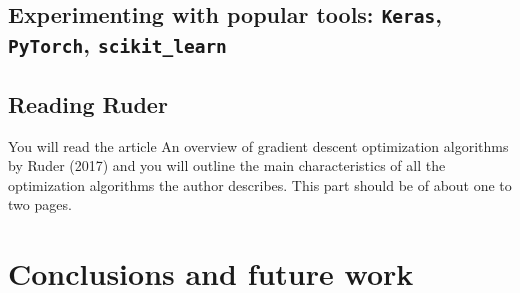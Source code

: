 \documentclass[a4paper]{article}
\begin{document}
\subsection{Experimenting with popular tools: \texttt{Keras}, \texttt{PyTorch}, \texttt{scikit\_learn}}

\subsection{Reading Ruder}
You will read the article An overview of gradient descent optimization algorithms by Ruder (2017) and you will outline the main characteristics of all the optimization algorithms the author describes. This part should be of about one to two pages. 
\cite{DBLP:journals/corr/Ruder16}


\section{Conclusions and future work}


\printbibliography
\end{document}
